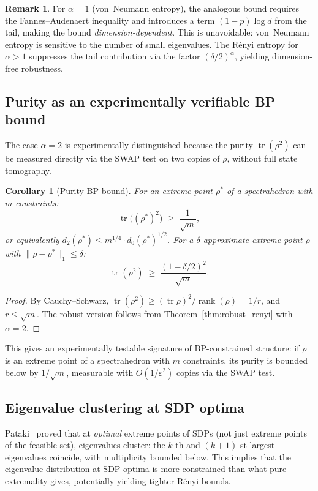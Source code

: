 \documentclass[11pt,a4paper]{article}
\newtheorem{corollary}[theorem]{Corollary}
\theoremstyle{definition}
\newtheorem{remark}[theorem]{Remark}
\begin{document}
\begin{remark}
For $\alpha = 1$ (von~Neumann entropy), the analogous bound requires the
Fannes--Audenaert inequality and introduces a term
$(1-p)\log d$ from the tail, making the bound \emph{dimension-dependent}.
This is unavoidable: von~Neumann entropy is sensitive to the number of
small eigenvalues.  The R\'enyi entropy for $\alpha > 1$ suppresses the
tail contribution via the factor $(\delta/2)^\alpha$, yielding
dimension-free robustness.
\end{remark}

\subsection{Purity as an experimentally verifiable BP bound}

The case $\alpha = 2$ is experimentally distinguished because the purity
$\operatorname{tr}(\rho^2)$ can be measured directly via the SWAP test
on two copies of $\rho$, without full state tomography.

\begin{corollary}[Purity BP bound]
\label{cor:purity_bp}
For an extreme point $\rho^*$ of a spectrahedron with $m$ constraints:
\[
  \operatorname{tr}\bigl((\rho^*)^2\bigr) \;\geq\; \frac{1}{\sqrt{m}},
\]
or equivalently $d_2(\rho^*) \leq m^{1/4} \cdot d_0(\rho^*)^{1/2}$.
For a $\delta$-approximate extreme point $\rho$ with
$\|\rho - \rho^*\|_1 \leq \delta$:
\[
  \operatorname{tr}(\rho^2) \;\geq\;
  \frac{(1-\delta/2)^2}{\sqrt{m}}.
\]
\end{corollary}

\begin{proof}
By Cauchy--Schwarz, $\operatorname{tr}(\rho^2) \geq
(\operatorname{tr}\rho)^2 / \operatorname{rank}(\rho) = 1/r$,
and $r \leq \sqrt{m}$.  The robust version follows from
Theorem~\ref{thm:robust_renyi} with $\alpha = 2$.
\end{proof}

This gives an experimentally testable signature of BP-constrained structure:
if $\rho$ is an extreme point of a spectrahedron with $m$ constraints, its
purity is bounded below by $1/\sqrt{m}$, measurable with $O(1/\varepsilon^2)$
copies via the SWAP test.

\subsection{Eigenvalue clustering at SDP optima}

Pataki~\cite{pataki98} proved that at \emph{optimal} extreme points of SDPs
(not just extreme points of the feasible set), eigenvalues cluster: the $k$-th
and $(k{+}1)$-st largest eigenvalues coincide, with multiplicity bounded below.
This implies that the eigenvalue distribution at SDP optima is more constrained
than what pure extremality gives, potentially yielding tighter R\'enyi bounds.
\end{document}
